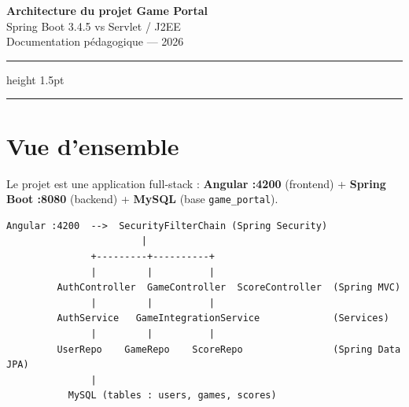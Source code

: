 \documentclass[11pt,a4paper]{article}
\newcommand{\code}[1]{\texttt{\small #1}}
\begin{document}

\begin{center}
  {\LARGE\bfseries Architecture du projet Game Portal}\\[6pt]
  {\large\color{sectionblue} Spring Boot 3.4.5 vs Servlet / J2EE}\\[4pt]
  {\small Documentation pédagogique — 2026}
\end{center}
\vspace{6pt}
\hrule height 1.5pt
\vspace{10pt}

\tableofcontents
\vspace{6pt}
\hrule
\newpage

\section{Vue d'ensemble}

Le projet est une application full-stack : \textbf{Angular :4200} (frontend) + \textbf{Spring Boot :8080} (backend) + \textbf{MySQL} (base \code{game\_portal}).

\begin{lstlisting}[language={}]
Angular :4200  -->  SecurityFilterChain (Spring Security)
                        |
               +---------+----------+
               |         |          |
         AuthController  GameController  ScoreController  (Spring MVC)
               |         |          |
         AuthService   GameIntegrationService             (Services)
               |         |          |
         UserRepo    GameRepo    ScoreRepo                (Spring Data JPA)
               |
           MySQL (tables : users, games, scores)
\end{lstlisting}
\end{document}
